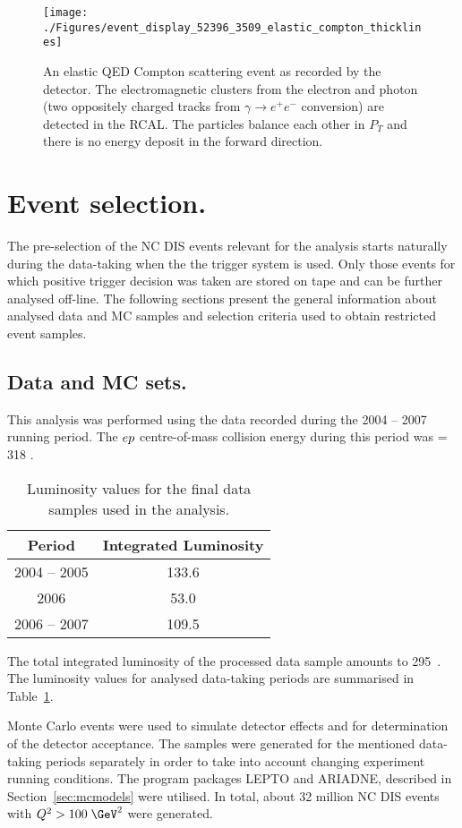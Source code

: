 \begin{figure}[htbp]
	\centering
	\texttt{[image: ./Figures/event\_display\_52396\_3509\_elastic\_compton\_thicklines]} 
	\caption{An elastic QED Compton scattering event as recorded by the \zeus detector. The electromagnetic clusters from the electron and photon (two oppositely charged tracks from $\gamma \rightarrow e^+e^-$ conversion) are detected in the RCAL. The particles balance each other in $P_T$ and there is no energy deposit in the forward direction.}
	\label{fig:qedceventdisplay}
\end{figure}

\section{Event selection.}
The pre-selection of the NC DIS events relevant for the analysis starts naturally during the data-taking when the the \zeus trigger system is used. Only those events for which positive trigger decision was taken are stored on tape and can be further analysed off-line. The following sections present the general information about analysed data and MC samples and selection criteria used to obtain restricted event samples.

\subsection{Data and MC sets.}
This analysis was performed using the data recorded during the 2004 -- 2007 running period. The $\mbox{$e p$}$ centre-of-mass collision energy during this period was \sqs = 318 \GeV.
\begin{table}
	\centering
		\begin{tabular}[h]{c|c}
		  \hline
			Period & Integrated Luminosity \\
			\hline \hline
			2004 -- 2005  & 133.6 \invpb  \\
			2006             & 53.0 \invpb   \\
			2006 -- 2007  & 109.5 \invpb \\
			\hline
		\end{tabular}
	\caption{Luminosity values for the final data samples used in the analysis.}
	\label{tab:selecteddatasample}
\end{table}
The total integrated luminosity of the processed data sample amounts to 295~\invpb. The luminosity values for analysed data-taking periods are summarised in Table~\ref{tab:selecteddatasample}.

Monte Carlo events were used to simulate detector effects and for determination of the detector acceptance. The samples were generated for the mentioned data-taking periods separately in order to take into account changing experiment running conditions. The program packages LEPTO and ARIADNE, described in Section~\ref{sec:mcmodels} were utilised. In total, about 32 million NC DIS events with $\qsq > 100\;\GeV^2$ were generated.

